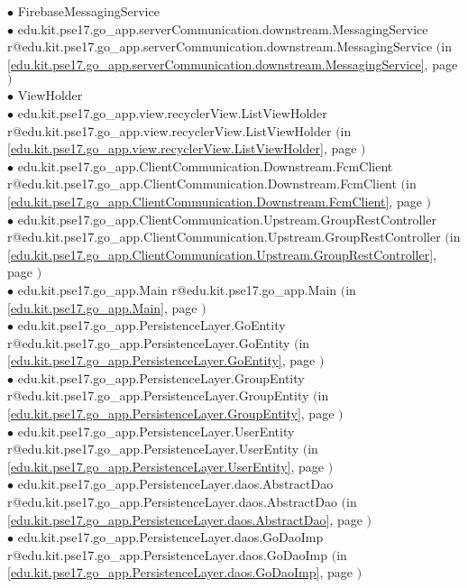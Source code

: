 \documentclass[11pt,a4paper]{report}
\makeatletter
\newcommand{\refdefined}[1]{
\expandafter\ifx\csname r@#1\endcsname\relax
\relax\else
{$($in \ref{#1}, page \pageref{#1}$)$}\fi}
\makeatother
\begin{document}
{{{\hspace{1.0cm} $\bullet$ FirebaseMessagingService {\tiny } \\
\hspace{2.0cm} $\bullet$ edu.kit.pse17.go\_app.serverCommunication.downstream.MessagingService {\tiny \refdefined{edu.kit.pse17.go_app.serverCommunication.downstream.MessagingService}} \\
\hspace{1.0cm} $\bullet$ ViewHolder {\tiny } \\
\hspace{2.0cm} $\bullet$ edu.kit.pse17.go\_app.view.recyclerView.ListViewHolder {\tiny \refdefined{edu.kit.pse17.go_app.view.recyclerView.ListViewHolder}} \\
\hspace{1.0cm} $\bullet$ edu.kit.pse17.go\_app.ClientCommunication.Downstream.FcmClient {\tiny \refdefined{edu.kit.pse17.go_app.ClientCommunication.Downstream.FcmClient}} \\
\hspace{1.0cm} $\bullet$ edu.kit.pse17.go\_app.ClientCommunication.Upstream.GroupRestController {\tiny \refdefined{edu.kit.pse17.go_app.ClientCommunication.Upstream.GroupRestController}} \\
\hspace{1.0cm} $\bullet$ edu.kit.pse17.go\_app.Main {\tiny \refdefined{edu.kit.pse17.go_app.Main}} \\
\hspace{1.0cm} $\bullet$ edu.kit.pse17.go\_app.PersistenceLayer.GoEntity {\tiny \refdefined{edu.kit.pse17.go_app.PersistenceLayer.GoEntity}} \\
\hspace{1.0cm} $\bullet$ edu.kit.pse17.go\_app.PersistenceLayer.GroupEntity {\tiny \refdefined{edu.kit.pse17.go_app.PersistenceLayer.GroupEntity}} \\
\hspace{1.0cm} $\bullet$ edu.kit.pse17.go\_app.PersistenceLayer.UserEntity {\tiny \refdefined{edu.kit.pse17.go_app.PersistenceLayer.UserEntity}} \\
\hspace{1.0cm} $\bullet$ edu.kit.pse17.go\_app.PersistenceLayer.daos.AbstractDao {\tiny \refdefined{edu.kit.pse17.go_app.PersistenceLayer.daos.AbstractDao}} \\
\hspace{2.0cm} $\bullet$ edu.kit.pse17.go\_app.PersistenceLayer.daos.GoDaoImp {\tiny \refdefined{edu.kit.pse17.go_app.PersistenceLayer.daos.GoDaoImp}} \\
}}}
\end{document}
